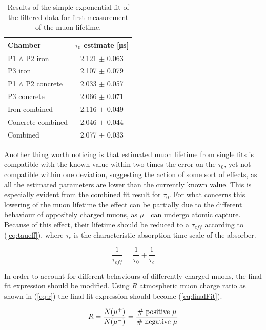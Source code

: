 \documentclass[../main.tex]{subfiles}
\begin{document}
\begin{table}[htb!]
    \caption{Results of the simple exponential fit of the filtered data for first measurement of the muon lifetime.}
    \label{tab:resultsSimple}
    \centering
        \begin{tabular}{|l|c|}
        \hline
        Chamber & $\tau_0$ estimate [\si{\micro \second}] \\ \hline
        P1 $\land$ P2 iron        & 2.121 $\pm$ 0.063 \\
        P3 iron           & 2.107 $\pm$ 0.079 \\
        P1 $\land$ P2 concrete    & 2.033 $\pm$ 0.057 \\
        P3 concrete       & 2.066 $\pm$ 0.071 \\ \hline
        Iron combined     & 2.116 $\pm$ 0.049 \\
        Concrete combined & 2.046 $\pm$ 0.044 \\ \hline
        Combined          & 2.077 $\pm$ 0.033 \\ \hline
        \end{tabular}
\end{table}

Another thing worth noticing is that estimated muon lifetime from single fits is compatible with the known value within two times the error on the $\tau_0$, yet not compatible within one deviation, suggesting the action of some sort of effects, as all the estimated parameters are lower than the currently known value. This is especially evident from the combined fit result for $\tau_0$. For what concerns this lowering of the muon lifetime the effect can be partially due to the different behaviour of oppositely charged muons, as $\mu^-$ can undergo atomic capture. Because of this effect, their lifetime should be reduced to a $\tau_{eff}$ according to (\ref{eq:taueff}), where $\tau_c$ is the characteristic absorption time scale of the absorber.

\begin{equation}
    \frac{1}{\tau_{eff}} = \frac{1}{\tau_0}+\frac{1}{\tau_c}
    \label{eq:taueff}
\end{equation}

In order to account for different behaviours of differently charged muons, the final fit expression should be modified. Using $R$ atmospheric muon charge ratio as shown in (\ref{eq:r}) the final fit expression should become (\ref{eq:finalFit}).

\begin{equation}
\label{eq:r}
    R = \frac{N(\mu^+)}{N(\mu^-)} = \frac{\textnormal{\# positive }\mu}{\textnormal{\# negative }\mu}
\end{equation}
\end{document}
